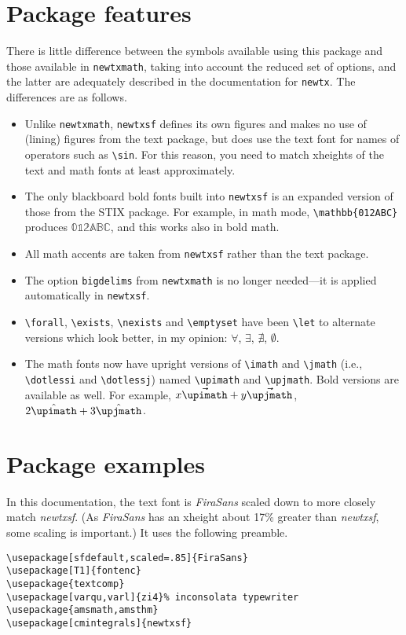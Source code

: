 \documentclass[11pt]{article}
\begin{document}
\section{Package features}
There is little difference between the symbols available using this package and those available in {\tt newtxmath}, taking into account the reduced set of options, and the latter are adequately described in the documentation for {\tt newtx}. The differences are as follows.
\begin{itemize}
\item
Unlike {\tt newtxmath}, {\tt newtxsf} defines its own figures and makes no use of (lining) figures from the text package, but does use the text font for names of operators such as \verb|\sin|. For this reason, you need to match xheights of the text and math fonts at least approximately.
\item The only blackboard bold fonts built into {\tt newtxsf} is an expanded version of those from the STIX package. For example, in math mode, \verb|\mathbb{012ABC}| produces $\mathbb{012ABC}$, and this works also in bold math.
\item All math accents are taken from {\tt newtxsf} rather than the text package.
\item The option {\tt bigdelims} from {\tt newtxmath} is no longer needed---it is applied automatically in {\tt newtxsf}.
\item \verb|\forall|, \verb|\exists|, \verb|\nexists| and \verb|\emptyset| have been \verb|\let| to alternate versions which look better, in my opinion: $\forall$, $\exists$, $\nexists$, $\emptyset$.
\item The math fonts now have upright versions of \verb|\imath| and \verb|\jmath| (i.e., \verb|\dotlessi| and \verb|\dotlessj|) named \verb|\upimath| and \verb|\upjmath|. Bold versions are available as well. For example, $x{\bm{\vec\upimath}}+y{\bm{\vec\upjmath}}$, $2\hat\upimath+3\hat\upjmath$.
\end{itemize}

\section{Package examples}
In this documentation, the text font is \emph{FiraSans} scaled down to  more closely match \emph{newtxsf}. (As \emph{FiraSans} has an xheight about 17\% greater than \emph{newtxsf}, some scaling is important.)
It uses the following preamble.
\begin{verbatim}
\usepackage[sfdefault,scaled=.85]{FiraSans}
\usepackage[T1]{fontenc} 
\usepackage{textcomp}
\usepackage[varqu,varl]{zi4}% inconsolata typewriter
\usepackage{amsmath,amsthm}
\usepackage[cmintegrals]{newtxsf}
\end{verbatim}
\end{document}
